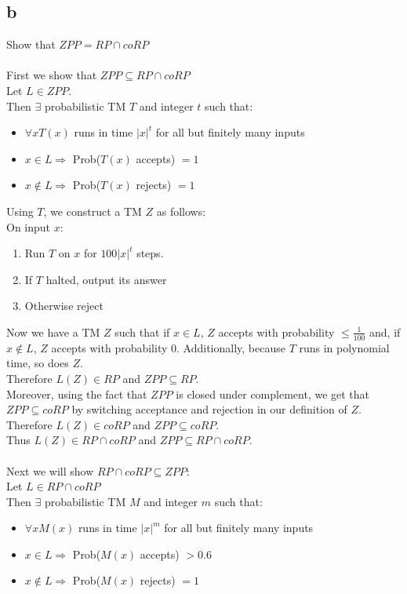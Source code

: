 \documentclass[letterpaper,notitlepage,twoside]{article}
\begin{document}
\subsection*{b}
Show that $ZPP = RP \cap coRP$ \\ \\
First we show that $ZPP \subseteq RP \cap coRP$ \\
Let $L \in ZPP$. \\
Then $\exists$ probabilistic TM $T$ and integer $t$ such that:
\begin{itemize}
  \item $\forall x T(x)$ runs in time $|x|^{t}$ for all but finitely many inputs
  \item $x \in L \Rightarrow$ Prob($T(x)$ accepts) $=1$
  \item $x \notin L \Rightarrow$ Prob($T(x)$ rejects) $=1$
\end{itemize}
Using $T$, we construct a TM $Z$ as follows: \\
On input $x$:
\begin{enumerate}
  \item Run $T$ on $x$ for $100|x|^{t}$ steps.
  \item If $T$ halted, output its answer
  \item Otherwise reject
\end{enumerate}
Now we have a TM $Z$ such that if $x \in L$, $Z$ accepts with probability $\leq \frac{1}{100}$ and, if $x \notin L$, $Z$ accepts with probability 0. Additionally, because $T$ runs in polynomial time, so does $Z$. \\
Therefore $L(Z) \in RP$ and $ZPP \subseteq RP$. \\ 
Moreover, using the fact that $ZPP$ is closed under complement, we get that $ZPP \subseteq coRP$ by switching acceptance and rejection in our definition of $Z$. \\
Therefore $L(Z) \in coRP$ and $ZPP \subseteq coRP$. \\
Thus $L(Z) \in RP \cap coRP$ and $ZPP \subseteq RP \cap coRP$.
\\ \\
Next we will show $RP \cap coRP \subseteq ZPP$: \\
Let $L \in RP \cap coRP$ \\
Then $\exists$ probabilistic TM $M$ and integer $m$ such that:
\begin{itemize}
  \item $\forall x M(x)$ runs in time $|x|^{m}$ for all but finitely many inputs
  \item $x \in L \Rightarrow$ Prob($M(x)$ accepts) $> 0.6$
  \item $x \notin L \Rightarrow$ Prob($M(x)$ rejects) $=1$
\end{itemize}
\end{document}
